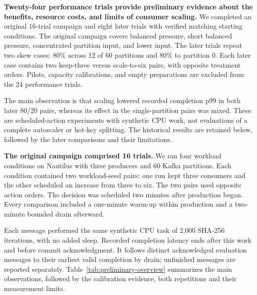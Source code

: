 \textbf{Twenty-four performance trials provide preliminary evidence about the benefits, resource costs, and limits of consumer scaling.} We completed an original 16-trial campaign and eight later trials with verified matching starting conditions. The original campaign covers balanced pressure, short balanced pressure, concentrated partition input, and lower input. The later trials repeat two skew cases: 80\% across 12 of 60 partitions and 80\% to partition 0. Each later case contains two keep-three versus scale-to-six pairs, with opposite treatment orders. Pilots, capacity calibrations, and empty preparations are excluded from the 24 performance trials.

The main observation is that scaling lowered recorded completion p99 in both later 80/20 pairs, whereas its effect in the single-partition pairs was mixed. These are scheduled-action experiments with synthetic CPU work, not evaluations of a complete autoscaler or hot-key splitting. The historical results are retained below, followed by the later comparisons and their limitations.

\textbf{The original campaign comprised 16 trials.} We ran four workload conditions on Nautilus with three producers and 60 Kafka partitions. Each condition contained two workload-seed pairs: one run kept three consumers and the other scheduled an increase from three to six. The two pairs used opposite action orders. The decision was scheduled two minutes after production began. Every comparison included a one-minute warm-up within production and a two-minute bounded drain afterward.

Each message performed the same synthetic CPU task of 2,000 SHA-256 iterations, with no added sleep. Recorded completion latency ends after this work and before commit acknowledgment. It follows distinct acknowledged evaluation messages to their earliest valid completion by drain; unfinished messages are reported separately. Table~\ref{tab:preliminary-overview} summarizes the main observations, followed by the calibration evidence, both repetitions and their measurement limits.

